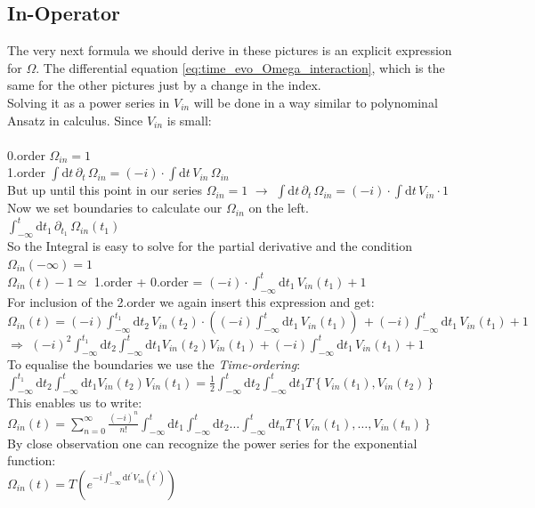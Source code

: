 \documentclass[12pt, titlepage]{article}
\begin{document}
\subsection{In-Operator}
The very next formula we should derive in these pictures is an explicit expression for $ \Omega $.
The differential equation \eqref{eq:time_evo_Omega_interaction}, which is the same for the other pictures just by a change in the index.
\\
Solving it as a power series in $ V_{in} $ will be done in a way similar to polynominal Ansatz in calculus. Since  $ V_{in} $ is small:
\\\\
0.order $ \Omega_{in} =1 $\\
1.order $ \int \! \mathrm{d}t  \, \partial_{t} \,\Omega_{in} =(-i) \cdot
 \int \! \mathrm{d}t \, V_{in} \,\Omega_{in} $\\
But up until this point in our series $ \Omega_{in} = 1 $ $ \rightarrow $ 
$ \int \! \mathrm{d}t  \, \partial_{t} \,\Omega_{in} =(-i) \cdot
 \int \! \mathrm{d}t \, V_{in}\cdot 1 $\\
Now we set boundaries to calculate our $ \Omega_{in} $ on the left.\\
$ \int_{-\infty}^t \! \mathrm{d}t_{1}  \, \partial_{t_{1}} \,\Omega_{in}(t_{1})$\\
So the Integral is easy to solve for the partial derivative  and the condition $ \Omega_{in}(-\infty)
= 1 $\\
$ \Omega_{in}(t) - 1 \simeq $ 1.order + 0.order = $ (-i) \cdot
 \int_{-\infty}^t\! \mathrm{d}t_1 \, V_{in}(t_1) + 1$
\\
For inclusion of the 2.order we again insert this expression and get:\\
$ \Omega_{in}(t) = (-i)\int_{-\infty}^{t_1} \! \mathrm{d}t_2 \, V_{in}(t_2)\cdot
\left( (-i)\int_{-\infty}^{t} \! \mathrm{d}t_1 \, V_{in}(t_1)\right)\,+ (-i)\int_{-\infty}^{t} \! \mathrm{d}t_1 \, V_{in}(t_1) +1 $
\\
$ \Rightarrow $  $ (-i)^{2} \int_{-\infty}^{t_1}\mathrm{d}t_2\int_{-\infty}^{t}\! \! \mathrm{d}t_1
V_{in}(t_2)V_{in}(t_1)
+ (-i)\int_{-\infty}^{t} \! \mathrm{d}t_1 \, V_{in}(t_1) 
+1 
$
\\
To equalise the boundaries we use the \emph{Time-ordering}:\\
$  
 \int_{-\infty}^{t_1}\mathrm{d}t_2\int_{-\infty}^{t}\! \! \mathrm{d}t_1
V_{in}(t_2)V_{in}(t_1)
=
\frac{1}{2}
\int_{-\infty}^{t}\mathrm{d}t_2\int_{-\infty}^{t}\! \! \mathrm{d}t_1
T\left\lbrace V_{in}(t_1),V_{in}(t_2)\right\rbrace 
$\\
This enables us to write:\\
$ \Omega_{in}(t) =
\sum\limits_{n=0}^{\infty} 
\frac{(-i)^{n}}{n!}
\int_{-\infty}^{t}\mathrm{d}t_1\int_{-\infty}^{t}\! \! \mathrm{d}t_2
 \ldots
 \int_{-\infty}^{t}\! \! \mathrm{d}t_n
 T\left\lbrace V_{in}(t_1), \ldots , V_{in}(t_n)\right\rbrace 
 $\\
 By close observation one can recognize the power series for the exponential function:
\\
$  \Omega_{in}(t) =T\left( e^{-i\int_{-\infty}^{t}\mathrm{d}t^{\prime} V_{in}(t^{\prime})} \right)  $
\end{document}
